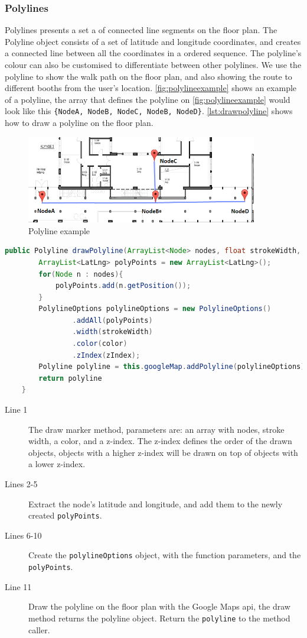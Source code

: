 \subsubsection*{Polylines}
Polylines presents a set a of connected line segments on the floor plan. The Polyline object consists of a set of latitude and longitude coordinates, and creates a connected line between all the coordinates in a ordered sequence. The polyline's colour can also be customised to differentiate between other polylines. We use the polyline to show the walk path on the floor plan, and also showing the route to different booths from the user's location. \autoref{fig:polylineexample} shows an example of a polyline, the array that defines the polyline on \autoref{fig:polylineexample} would look like this \lstinline|{NodeA, NodeB, NodeC, NodeB, NodeD}|. \autoref{lst:drawpolyline} shows how to draw a polyline on the floor plan.
\begin{figure}[H]
\centering
\includegraphics[width=0.9\textwidth]{img/polylineExample.png}
\caption{Polyline example}
\label{fig:polylineexample}
\end{figure}
\begin{lstlisting}[language=java, label=lst:drawpolyline, caption=Method for drawing a polyline.]
    public Polyline drawPolyline(ArrayList<Node> nodes, float strokeWidth, int color, int zIndex){
        ArrayList<LatLng> polyPoints = new ArrayList<LatLng>();
        for(Node n : nodes){
            polyPoints.add(n.getPosition());
        }
        PolylineOptions polylineOptions = new PolylineOptions()
                .addAll(polyPoints)
                .width(strokeWidth)
                .color(color)
                .zIndex(zIndex);
        Polyline polyline = this.googleMap.addPolyline(polylineOptions);
        return polyline
    }
\end{lstlisting}
\begin{description}
\item[Line 1] The draw marker method, parameters are: an array with nodes, stroke width, a color, and a z-index. The z-index defines the order of the drawn objects,  objects with a higher z-index will be drawn on top of objects with a lower z-index. 
\item[Lines 2-5] Extract the node's latitude and longitude, and add them to the newly created \lstinline|polyPoints|.
\item[Lines 6-10] Create the \lstinline|polylineOptions| object, with the function parameters, and the \lstinline|polyPoints|.
\item[Line 11] Draw the polyline on the floor plan with the Google Maps \ac{api}, the draw method returns the polyline object. Return the \lstinline|polyline| to the method caller.
\end{description}

